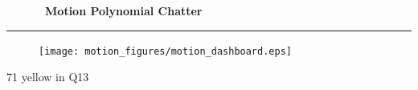 \cleardoublepage
\begin{figure}[h!]
  \centering
  \hfill
  {\Huge {\bf \quarter\ Motion Polynomial Chatter}}
  \hfill
\end{figure}
\hrule

\begin{figure}[h!]
  \centering
  \texttt{[image: motion\_figures/motion\_dashboard.eps]}
\end{figure}

71 yellow in Q13

